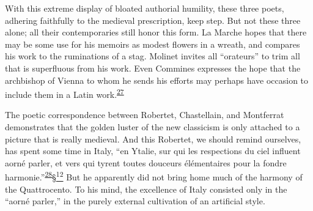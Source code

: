With this extreme display of bloated authorial humility, these three
poets, adhering faithfully to the medieval prescription, keep step. But
not these three alone; all their contemporaries still honor this form.
La Marche hopes that there may be some use for his memoirs as modest
flowers in a wreath, and compares his work to the ruminations of a stag.
Molinet invites all ``orateurs'' to trim all that is superfluous from
his work. Even Commines expresses the hope that the archbishop of Vienna
to whom he sends his efforts may perhaps have occasion to include them
in a Latin
work.\textsuperscript{\protect\hypertarget{22_Chapter_Fourteen__THE_COMING_OF.xhtmlux5cux23id_70}{\protect\hyperlink{23_NOTES.xhtmlux5cux23id_71}{27}}}

The poetic correspondence between Robertet, Chastellain, and Montferrat
demonstrates that the golden luster of the new classicism is only
attached to a picture that is really medieval. And this Robertet, we
should remind ourselves, has spent some time in Italy, ``en Ytalie, sur
qui les respections du ciel influent aorné parler, et vers qui tyrent
toutes douceurs élémentaires pour la fondre
harmonie.''\textsuperscript{\protect\hypertarget{22_Chapter_Fourteen__THE_COMING_OF.xhtmlux5cux23id_68}{\protect\hyperlink{23_NOTES.xhtmlux5cux23id_69}{28}}}\protect\hypertarget{22_Chapter_Fourteen__THE_COMING_OF.xhtmlux5cux23id_2383}{\protect\hyperlink{23_NOTES.xhtmlux5cux23id_2384}{§\textsuperscript{12}}}
But he apparently did not bring home much of the harmony of the
Quattrocento. To his mind, the excellence of Italy consisted only in the
``aorné parler,'' in the purely external cultivation of an artificial
style.

